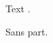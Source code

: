 \documentclass{article}
\begin{document}
Text \cite{a}.


\renewcommand\familydefault{\sfdefault}\normalfont
Sans part.
\end{document}
